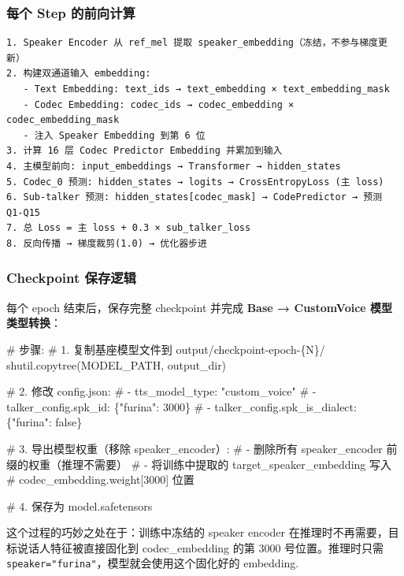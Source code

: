 \documentclass[
  english,
  letterpaper,
  DIV=11,
  numbers=noendperiod]{scrartcl}
\newenvironment{Shaded}{\begin{snugshade}}{\end{snugshade}}
\newcommand{\CommentTok}[1]{\textcolor[rgb]{0.37,0.37,0.37}{#1}}
\newcommand{\NormalTok}[1]{\textcolor[rgb]{0.00,0.23,0.31}{#1}}
\begin{document}
\subsubsection{每个 Step
的前向计算}\label{ux6bcfux4e2a-step-ux7684ux524dux5411ux8ba1ux7b97}

\begin{verbatim}
1. Speaker Encoder 从 ref_mel 提取 speaker_embedding（冻结，不参与梯度更新）
2. 构建双通道输入 embedding:
   - Text Embedding: text_ids → text_embedding × text_embedding_mask
   - Codec Embedding: codec_ids → codec_embedding × codec_embedding_mask
   - 注入 Speaker Embedding 到第 6 位
3. 计算 16 层 Codec Predictor Embedding 并累加到输入
4. 主模型前向: input_embeddings → Transformer → hidden_states
5. Codec_0 预测: hidden_states → logits → CrossEntropyLoss (主 loss)
6. Sub-talker 预测: hidden_states[codec_mask] → CodePredictor → 预测 Q1-Q15
7. 总 Loss = 主 loss + 0.3 × sub_talker_loss
8. 反向传播 → 梯度裁剪(1.0) → 优化器步进
\end{verbatim}

\subsubsection{Checkpoint
保存逻辑}\label{checkpoint-ux4fddux5b58ux903bux8f91}

每个 epoch 结束后，保存完整 checkpoint 并完成 \textbf{Base → CustomVoice
模型类型转换}：

\begin{Shaded}
\begin{Highlighting}[]
\CommentTok{\# 步骤:}
\CommentTok{\# 1. 复制基座模型文件到 output/checkpoint{-}epoch{-}\{N\}/}
\NormalTok{shutil.copytree(MODEL\_PATH, output\_dir)}

\CommentTok{\# 2. 修改 config.json:}
\CommentTok{\#    {-} tts\_model\_type: "custom\_voice"}
\CommentTok{\#    {-} talker\_config.spk\_id: \{"furina": 3000\}}
\CommentTok{\#    {-} talker\_config.spk\_is\_dialect: \{"furina": false\}}

\CommentTok{\# 3. 导出模型权重（移除 speaker\_encoder）:}
\CommentTok{\#    {-} 删除所有 speaker\_encoder 前缀的权重（推理不需要）}
\CommentTok{\#    {-} 将训练中提取的 target\_speaker\_embedding 写入}
\CommentTok{\#      codec\_embedding.weight[3000] 位置}

\CommentTok{\# 4. 保存为 model.safetensors}
\end{Highlighting}
\end{Shaded}

这个过程的巧妙之处在于：训练中冻结的 speaker encoder
在推理时不再需要，目标说话人特征被直接固化到 codec\_embedding 的第 3000
号位置。推理时只需 \texttt{speaker="furina"}，模型就会使用这个固化好的
embedding.
\end{document}
